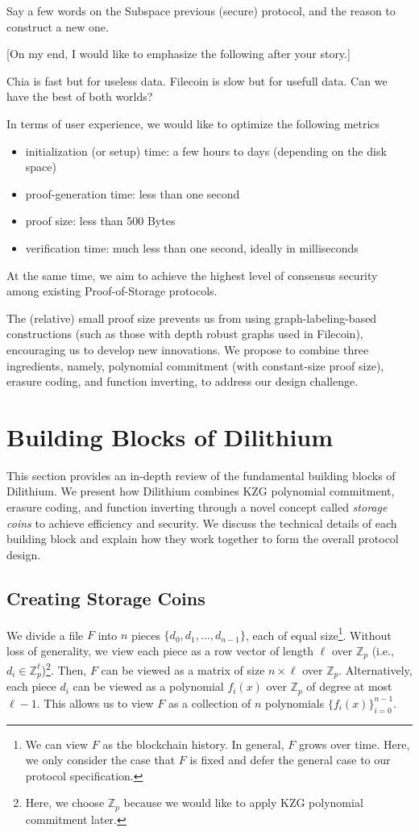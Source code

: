 \documentclass[12pt, onecolumn]{IEEEtran}
\newcommand{\Fp}{\mathbb{Z}_p}
\begin{document}
Say a few words on the Subspace previous (secure) protocol, and the reason to construct a new one.

[On my end, I would like to emphasize the following after your story.]


Chia is fast but for useless data. Filecoin is slow but for usefull data. Can we have the best of both worlds?

In terms of user experience, we would like to optimize the following metrics
\begin{itemize}
    \item initialization (or setup) time: a few hours to days (depending on the disk space)
    \item proof-generation time: less than one second
    \item proof size: less than 500 Bytes
    \item verification time: much less than one second, ideally in milliseconds
\end{itemize}
At the same time, we aim to achieve the highest level of {consensus security} among existing Proof-of-Storage protocols. 

The (relative) small proof size prevents us from using graph-labeling-based constructions (such as those with depth robust graphs used in Filecoin), encouraging us to develop new innovations. We propose to combine three ingredients, namely, polynomial commitment (with constant-size proof size), erasure coding, and function inverting, to address our design challenge. 

\section{Building Blocks of Dilithium}

This section provides an in-depth review of the fundamental building blocks of Dilithium.
We present how Dilithium combines KZG polynomial commitment, erasure coding, and function inverting through a novel concept called \emph{storage coins} to achieve efficiency and security. We discuss the technical details of each building block and explain how they work together to form the overall protocol design. 

\subsection{Creating Storage Coins}

We divide a file $F$ into $n$ pieces $\{ d_0, d_1, \ldots, d_{n-1}\}$, each of equal size\footnote{We can view $F$ as the blockchain history. In general, $F$ grows over time. Here, we only consider the case that $F$ is fixed and defer the general case to our protocol specification.}. 
Without loss of generality, we view each piece as a row vector of length $\ell$ over $\Fp$  (i.e., $d_i \in \Fp^\ell$)\footnote{Here, we choose $\Fp$ because we would like to apply KZG polynomial commitment later.}.
Then, $F$ can be viewed as a matrix of size $n \times \ell$ over $\Fp$.
Alternatively, each piece $d_i$ can be viewed as a polynomial $f_i(x)$ over $\Fp$ of degree at most $\ell - 1$. 
This allows us to view $F$ as a collection of $n$ polynomials $\{ f_i(x) \}_{i = 0}^{n-1}$. 
\end{document}
